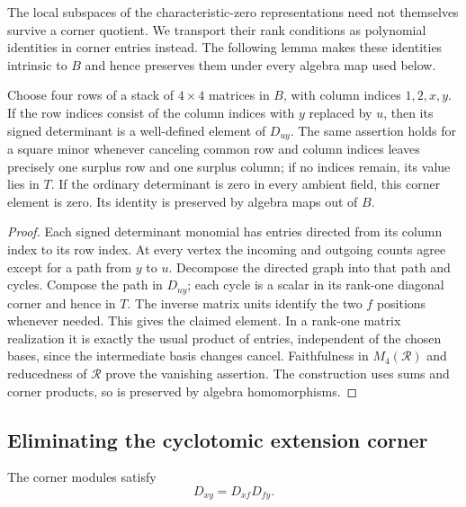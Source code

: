 The local subspaces of the characteristic-zero representations need
not themselves survive a corner quotient.  We transport their rank
conditions as polynomial identities in corner entries instead.  The
following lemma makes these identities intrinsic to $B$ and hence
preserves them under every algebra map used below.
\begin{lemma}
\label{lem:corner-minors}
Choose four rows of a stack of $4\times4$ matrices in $B$, with
column indices $1,2,x,y$.  If the row indices consist of the column
indices with $y$ replaced by $u$, then its signed determinant is a
well-defined element of $D_{uy}$.  The same assertion holds for a square minor whenever canceling
common row and column indices leaves precisely one surplus row
and one surplus column; if no indices remain, its value lies in $T$.
If the ordinary determinant is zero in every ambient field, this
corner element is zero.  Its identity is preserved by algebra maps
out of $B$.
\end{lemma}

\begin{proof}
Each signed determinant monomial has entries directed from its
column index to its row index.  At every vertex the incoming and
outgoing counts agree except for a path from $y$ to $u$.  Decompose
the directed graph into that path and cycles.  Compose the path in
$D_{uy}$; each cycle is a scalar in its rank-one diagonal corner and
hence in $T$.  The inverse matrix units identify the two $f$
positions whenever needed.  This gives the claimed element.  In a
rank-one matrix realization it is exactly the usual product of
entries, independent of the chosen bases, since the intermediate
basis changes cancel.  Faithfulness in $M_4(\mathcal R)$ and
reducedness of $\mathcal R$ prove the vanishing assertion.  The
construction uses sums and corner products, so is preserved by
algebra homomorphisms.
\end{proof}

\subsection{Eliminating the cyclotomic extension corner}

\begin{proposition}
\label{prop:cyclotomic-corner}
The corner modules satisfy
\begin{equation}
 D_{xy}=D_{xf}D_{fy}.
 \label{eq:xy-factorization}
\end{equation}
\end{proposition}

